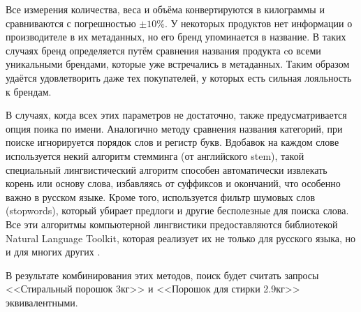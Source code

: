\documentclass[a4paper,12pt]{article}
\begin{document}
  Все измерения количества, веса и объёма конвертируются в килограммы и сравниваются с погрешностью $\pm 10\%$.
  У некоторых продуктов нет информации о производителе в их метаданных, но его бренд упоминается в название.
  В таких случаях бренд определяется путём сравнения названия продукта cо всеми уникальными брендами,
  которые уже встречались в метаданных.
  Таким образом удаётся удовлетворить даже тех покупателей, у которых есть сильная лояльность к брендам.

  В случаях, когда всех этих параметров не достаточно, также предусматривается опция поика по имени.
  Аналогично методу сравнения названия категорий, при поиске игнорируется порядок слов и регистр букв.
  Вдобавок на каждом слове используется некий алгоритм стемминга (от английского stem),
  такой специальный лингвистический алгоритм способен автоматически извлекать корень или основу слова,
  избавляясь от суффиксов и окончаний, что особенно важно в русском языке.
  Кроме того, используется фильтр шумовых слов (stopwords), который убирает предлоги и другие бесполезные для поиска слова.
  Все эти алгоритмы компьютерной лингвистики предоставляются библиотекой Natural Language Toolkit,
  которая реализует их не только для русского языка, но и для многих других \cite{nltk}.

  В результате комбинирования этих методов, поиск будет считать запросы
  <<Стиральный порошок 3кг>> и <<Порошок для стирки 2.9кг>> эквивалентными.



\end{document}
